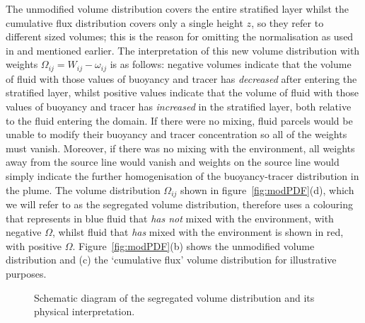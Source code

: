 \documentclass[a4paper]{article}
\begin{document}
The unmodified volume distribution covers the entire stratified layer whilst the cumulative flux
distribution covers only a single height $z$, so they refer to different sized volumes; this is the reason for
omitting the normalisation as used in \citet{penney2020} and mentioned earlier. The interpretation of this new
volume distribution with weights $\Omega_{ij} = W_{ij} - \omega_{ij}$ is as follows: negative volumes indicate
that the volume of fluid with those values of buoyancy and tracer has \emph{decreased} after entering the
stratified layer, whilst positive values indicate that the volume of fluid with those values of buoyancy and
tracer has \emph{increased} in the stratified layer, both relative to the fluid entering the domain. If there
were no mixing, fluid parcels would be unable to modify their buoyancy and tracer concentration so all of the
weights must vanish. Moreover, if there was no mixing with the environment, all weights away from the source
line would vanish and weights on the source line would simply indicate the further homogenisation of the
buoyancy-tracer distribution in the plume. The volume distribution $\Omega_{ij}$ shown in
figure~\ref{fig:modPDF}(d), which we will refer to as the segregated volume distribution, therefore uses a
colouring that represents in blue fluid that \emph{has not} mixed with the environment, with negative
$\Omega$, whilst fluid that \emph{has} mixed with the environment is shown in red, with positive $\Omega$.
Figure~\ref{fig:modPDF}(b) shows the unmodified volume distribution and (c) the `cumulative flux' volume
distribution for illustrative purposes.

\begin{figure}
	\centering
	\caption{Schematic diagram of the segregated volume distribution and its physical interpretation.}
	\label{fig:PDFschematic}
\end{figure}
\end{document}
